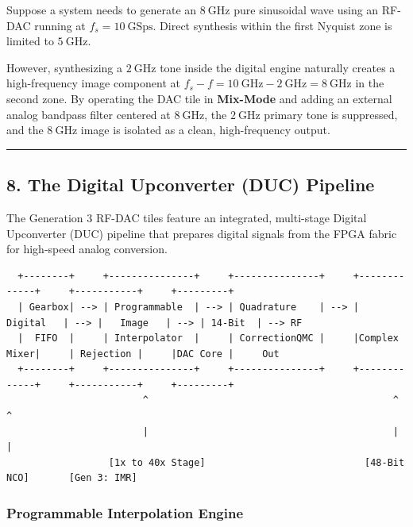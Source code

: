 \documentclass[
]{article}
\begin{document}
Suppose a system needs to generate an \(8\ \text{GHz}\) pure sinusoidal
wave using an RF-DAC running at \(f_s = 10\ \text{GSps}\). Direct
synthesis within the first Nyquist zone is limited to \(5\ \text{GHz}\).

However, synthesizing a \(2\ \text{GHz}\) tone inside the digital engine
naturally creates a high-frequency image component at
\(f_s - f = 10\ \text{GHz} - 2\ \text{GHz} = 8\ \text{GHz}\) in the
second zone. By operating the DAC tile in \textbf{Mix-Mode} and adding
an external analog bandpass filter centered at \(8\ \text{GHz}\), the
\(2\ \text{GHz}\) primary tone is suppressed, and the \(8\ \text{GHz}\)
image is isolated as a clean, high-frequency output.

\begin{center}\rule{0.5\linewidth}{0.5pt}\end{center}

\subsection{8. The Digital Upconverter (DUC)
Pipeline}\label{the-digital-upconverter-duc-pipeline}

The Generation 3 RF-DAC tiles feature an integrated, multi-stage Digital
Upconverter (DUC) pipeline that prepares digital signals from the FPGA
fabric for high-speed analog conversion.

\begin{verbatim}
  +--------+     +---------------+     +---------------+     +-------------+     +-----------+     +---------+
  | Gearbox| --> | Programmable  | --> | Quadrature    | --> |   Digital   | --> |   Image   | --> | 14-Bit  | --> RF
  |  FIFO  |     | Interpolator  |     | CorrectionQMC |     |Complex Mixer|     | Rejection |     |DAC Core |     Out
  +--------+     +---------------+     +---------------+     +-------------+     +-----------+     +---------+
                        ^                                           ^                  ^
                        |                                           |                  |
                  [1x to 40x Stage]                            [48-Bit NCO]       [Gen 3: IMR]
\end{verbatim}

\subsubsection{Programmable Interpolation
Engine}\label{programmable-interpolation-engine}
\end{document}
